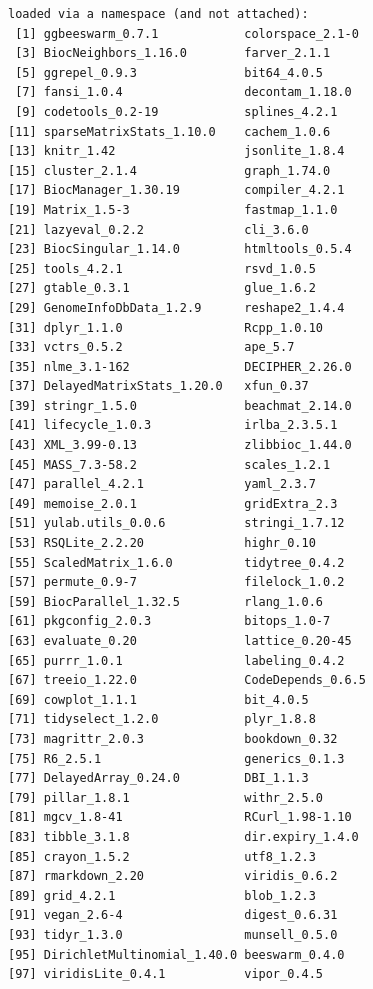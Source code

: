 \documentclass[
]{book}
\begin{document}
\begin{verbatim}
loaded via a namespace (and not attached):
 [1] ggbeeswarm_0.7.1            colorspace_2.1-0           
 [3] BiocNeighbors_1.16.0        farver_2.1.1               
 [5] ggrepel_0.9.3               bit64_4.0.5                
 [7] fansi_1.0.4                 decontam_1.18.0            
 [9] codetools_0.2-19            splines_4.2.1              
[11] sparseMatrixStats_1.10.0    cachem_1.0.6               
[13] knitr_1.42                  jsonlite_1.8.4             
[15] cluster_2.1.4               graph_1.74.0               
[17] BiocManager_1.30.19         compiler_4.2.1             
[19] Matrix_1.5-3                fastmap_1.1.0              
[21] lazyeval_0.2.2              cli_3.6.0                  
[23] BiocSingular_1.14.0         htmltools_0.5.4            
[25] tools_4.2.1                 rsvd_1.0.5                 
[27] gtable_0.3.1                glue_1.6.2                 
[29] GenomeInfoDbData_1.2.9      reshape2_1.4.4             
[31] dplyr_1.1.0                 Rcpp_1.0.10                
[33] vctrs_0.5.2                 ape_5.7                    
[35] nlme_3.1-162                DECIPHER_2.26.0            
[37] DelayedMatrixStats_1.20.0   xfun_0.37                  
[39] stringr_1.5.0               beachmat_2.14.0            
[41] lifecycle_1.0.3             irlba_2.3.5.1              
[43] XML_3.99-0.13               zlibbioc_1.44.0            
[45] MASS_7.3-58.2               scales_1.2.1               
[47] parallel_4.2.1              yaml_2.3.7                 
[49] memoise_2.0.1               gridExtra_2.3              
[51] yulab.utils_0.0.6           stringi_1.7.12             
[53] RSQLite_2.2.20              highr_0.10                 
[55] ScaledMatrix_1.6.0          tidytree_0.4.2             
[57] permute_0.9-7               filelock_1.0.2             
[59] BiocParallel_1.32.5         rlang_1.0.6                
[61] pkgconfig_2.0.3             bitops_1.0-7               
[63] evaluate_0.20               lattice_0.20-45            
[65] purrr_1.0.1                 labeling_0.4.2             
[67] treeio_1.22.0               CodeDepends_0.6.5          
[69] cowplot_1.1.1               bit_4.0.5                  
[71] tidyselect_1.2.0            plyr_1.8.8                 
[73] magrittr_2.0.3              bookdown_0.32              
[75] R6_2.5.1                    generics_0.1.3             
[77] DelayedArray_0.24.0         DBI_1.1.3                  
[79] pillar_1.8.1                withr_2.5.0                
[81] mgcv_1.8-41                 RCurl_1.98-1.10            
[83] tibble_3.1.8                dir.expiry_1.4.0           
[85] crayon_1.5.2                utf8_1.2.3                 
[87] rmarkdown_2.20              viridis_0.6.2              
[89] grid_4.2.1                  blob_1.2.3                 
[91] vegan_2.6-4                 digest_0.6.31              
[93] tidyr_1.3.0                 munsell_0.5.0              
[95] DirichletMultinomial_1.40.0 beeswarm_0.4.0             
[97] viridisLite_0.4.1           vipor_0.4.5                
\end{verbatim}
\end{document}
